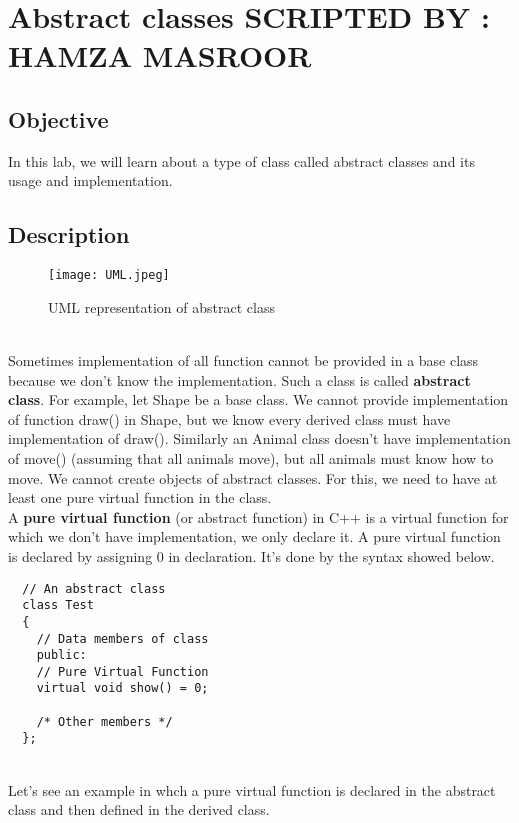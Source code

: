 \documentclass[11pt,fleqn]{book} %
\begin{document}
\newpage

\chapter{Abstract classes \hspace{44mm} {\textsc{\small SCRIPTED BY : HAMZA MASROOR}}}
\section{Objective}
In this lab, we will learn about a type of class called abstract classes and its usage and implementation.
\section{Description}
\begin{figure}[h]
  \centering
  \texttt{[image: UML.jpeg]}
  \caption{UML representation of abstract class}
\end{figure} ~\\
Sometimes implementation of all function cannot be provided in a base class because we don’t know the implementation. Such a class is called \textbf{abstract class}. For example, let Shape be a base class. We cannot provide implementation of function draw() in Shape, but we know every derived class must have implementation of draw(). Similarly an Animal class doesn’t have implementation of move() (assuming that all animals move), but all animals must know how to move. We cannot create objects of abstract classes. For this, we need to have at least one pure virtual function in the class. \\
A \textbf{pure virtual function} (or abstract function) in C++ is a virtual function for which we don’t have implementation, we only declare it. A pure virtual function is declared by assigning 0 in declaration. It's done by the syntax showed below.
\begin{lstlisting}
  // An abstract class
  class Test
  {   
    // Data members of class
    public:
    // Pure Virtual Function
    virtual void show() = 0;

    /* Other members */
  };
\end{lstlisting} ~\\
Let's see an example in whch a pure virtual function is declared in the abstract class and then defined in the derived class.
\end{document}
